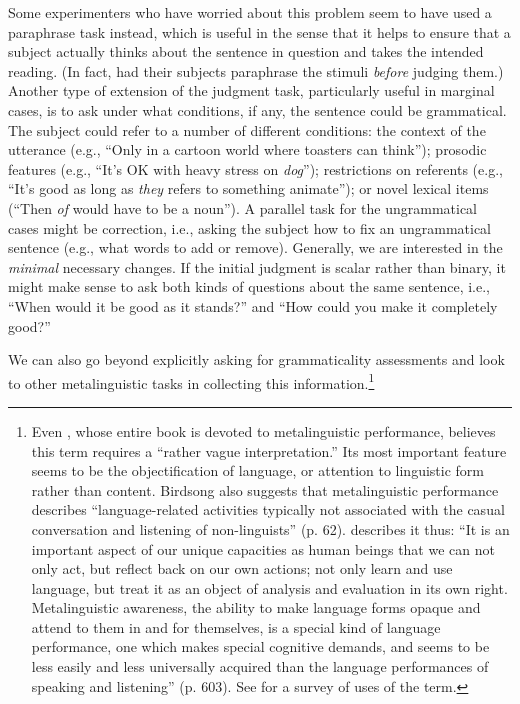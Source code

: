 Some experimenters  who have worried  about this problem  seem to have used a paraphrase task instead, which is useful in the sense that it helps to ensure that a subject actually thinks about the sentence in question and takes the intended reading. (In fact, \citet{ConnorsEtAl1993} had their  subjects paraphrase  the stimuli \textit{before} judging them.) Another type of extension of the judgment task, particularly useful  in marginal  cases, is to ask under  what  conditions, if  any, the sentence could be grammatical. The subject could refer to a number  of different  conditions: the context of the utterance (e.g., ``Only in a cartoon world where toasters can think''); prosodic features (e.g., ``It's OK with heavy stress on \textit{dog}''); restrictions on referents  (e.g., ``It's good as long as \textit{they} refers to something animate''); or novel lexical items (``Then \textit{of} would have to be a noun''). A parallel task for the ungrammatical cases might be correction, i.e., asking the subject how to fix an ungrammatical sentence (e.g., what words to add or remove). Generally, we are interested in the \textit{minimal} necessary  changes. If the initial judgment  is scalar rather than binary, it might make sense to ask both kinds of questions about the same sentence, i.e., ``When would it be good as it stands?'' and ``How could you make it completely  good?''

We can also go beyond explicitly asking for grammaticality assessments and look to other metalinguistic tasks in collecting this information.\footnote{Even \citet{Birdsong1989}, whose entire book is devoted to metalinguistic performance, believes this term requires a ``rather vague interpretation.'' Its most important feature seems to be the objectification of language, or attention to linguistic form rather than content. Birdsong also suggests that metalinguistic performance describes ``language-related activities typically not associated with the casual conversation and listening of non-linguists'' (p. 62). \citet{Cazden1976} describes it thus: ``It is an important aspect of our unique capacities as human beings that we can not only act, but reflect back
on our own actions; not only learn and use language, but treat it as an object of analysis and evaluation in its own right. Metalinguistic awareness, the ability to make language forms opaque and attend to them in and for themselves, is a special kind of language performance, one which makes special cognitive demands, and seems to be less easily and less universally acquired than the language performances of speaking and listening'' (p. 603). See \citet{Gombert1992} for a survey of uses of the term.}

